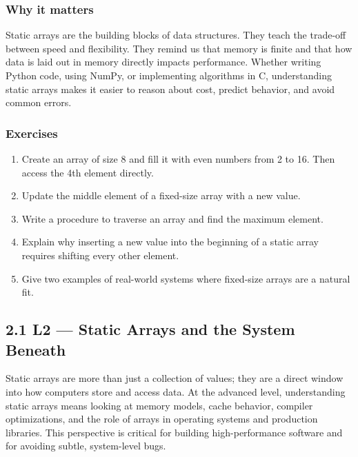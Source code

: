 \documentclass[
  letterpaper,
  DIV=11,
  numbers=noendperiod]{scrreprt}
\providecommand{\tightlist}{%
  \setlength{\itemsep}{0pt}\setlength{\parskip}{0pt}}
\begin{document}
\subsubsection{Why it matters}\label{why-it-matters-13}

Static arrays are the building blocks of data structures. They teach the
trade-off between speed and flexibility. They remind us that memory is
finite and that how data is laid out in memory directly impacts
performance. Whether writing Python code, using NumPy, or implementing
algorithms in C, understanding static arrays makes it easier to reason
about cost, predict behavior, and avoid common errors.

\subsubsection{Exercises}\label{exercises-13}

\begin{enumerate}
\def\labelenumi{\arabic{enumi}.}
\tightlist
\item
  Create an array of size 8 and fill it with even numbers from 2 to 16.
  Then access the 4th element directly.
\item
  Update the middle element of a fixed-size array with a new value.
\item
  Write a procedure to traverse an array and find the maximum element.
\item
  Explain why inserting a new value into the beginning of a static array
  requires shifting every other element.
\item
  Give two examples of real-world systems where fixed-size arrays are a
  natural fit.
\end{enumerate}

\subsection{2.1 L2 --- Static Arrays and the System
Beneath}\label{l2-static-arrays-and-the-system-beneath}

Static arrays are more than just a collection of values; they are a
direct window into how computers store and access data. At the advanced
level, understanding static arrays means looking at memory models, cache
behavior, compiler optimizations, and the role of arrays in operating
systems and production libraries. This perspective is critical for
building high-performance software and for avoiding subtle, system-level
bugs.
\end{document}
